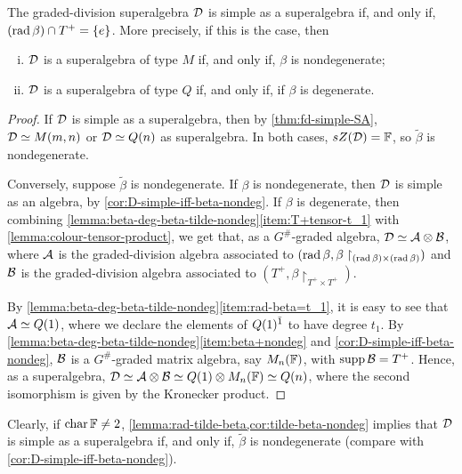 \begin{cor}\label{cor:tilde-beta-nondeg}
    The graded-division superalgebra $\mathcal{D}$ is simple as a superalgebra if, and only if, $(\operatorname{rad} \beta) \cap T^+ = \{e\}$. 
    More precisely, if this is the case, then
    \begin{enumerate}[(i)]
        \item $\mathcal{D}$ is a superalgebra of type $M$ if, and only if, $\beta$ is nondegenerate;
        \item $\mathcal{D}$ is a superalgebra of type $Q$ if, and only if, if $\beta$ is degenerate.
    \end{enumerate}
\end{cor}

\begin{proof}
    If $\mathcal{D}$ is simple as a superalgebra, then by \cref{thm:fd-simple-SA}, $\mathcal{D} \simeq M(m,n)$ or $\mathcal{D} \simeq Q(n)$ as superalgebra. 
    In both cases, $sZ(\mathcal{D}) = \mathbb{F}$, so $\tilde\beta$ is nondegenerate.

    Conversely, suppose $\tilde\beta$ is nondegenerate. 
    If $\beta$ is nondegenerate, then $\mathcal{D}$ is simple as an algebra, by \cref{cor:D-simple-iff-beta-nondeg}.  
    If $\beta$ is degenerate, then combining  \cref{lemma:beta-deg-beta-tilde-nondeg}\eqref{item:T+tensor-t_1} with \cref{lemma:colour-tensor-product}, we get that, as a $G^\#$-graded algebra, $\mathcal{D} \simeq \mathcal A \otimes \mathcal B$, where $\mathcal A$ is the graded-division algebra associated to $(\operatorname{rad} \beta, \beta\restriction_{(\operatorname{rad} \beta)\times (\operatorname{rad} \beta)})$ and $\mathcal B$ is the graded-division algebra associated to $(T^+, \beta\restriction_{T^+ \times T^+})$. 
    
    By \cref{lemma:beta-deg-beta-tilde-nondeg}\eqref{item:rad-beta=t_1}, it is easy to see that $\mathcal A \simeq Q(1)$, where we declare the elements of $Q(1)^{\bar1}$ to have degree $t_1$. 
    By \cref{lemma:beta-deg-beta-tilde-nondeg}\eqref{item:beta+nondeg} and \cref{cor:D-simple-iff-beta-nondeg}, $\mathcal B$ is a $G^\#$-graded matrix algebra, say $M_n(\mathbb{F})$, with $\operatorname{supp} \mathcal B = T^+$. 
    Hence, as a superalgebra, $\mathcal{D} \simeq \mathcal A \otimes \mathcal B \simeq Q(1) \otimes M_n(\mathbb{F}) \simeq Q(n)$, where the second isomorphism is given by the Kronecker product. 
\end{proof}

\begin{remark}\label{rmk:D-simple-iff-tilde-beta-nondeg}
    Clearly, if $\operatorname{char} \mathbb{F} \neq 2$, \cref{lemma:rad-tilde-beta,cor:tilde-beta-nondeg} implies that $\mathcal{D}$ is simple as a superalgebra if, and only if, $\tilde\beta $ is nondegenerate (compare with \cref{cor:D-simple-iff-beta-nondeg}). 
\end{remark}

